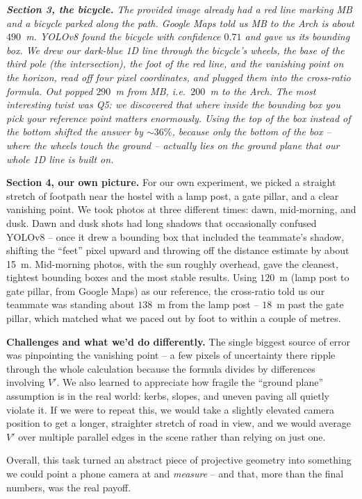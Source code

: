 \documentclass[11pt]{article}
\newenvironment{studentSpace}{\itshape}{}
\begin{document}
\begin{studentSpace}
\textbf{Section 3, the bicycle.} The provided image already had a red
line marking MB and a bicycle parked along the path. Google Maps told
us MB to the Arch is about $490$~m. YOLOv8 found the bicycle with
confidence $0.71$ and gave us its bounding box. We drew our dark-blue
1D line through the bicycle's wheels, the base of the third pole
(the intersection), the foot of the red line, and the vanishing point
on the horizon, read off four pixel coordinates, and plugged them into
the cross-ratio formula. Out popped $290$~m from MB, i.e.\ $200$~m to
the Arch. The most interesting twist was Q5: we discovered that
\emph{where} inside the bounding box you pick your reference point
matters enormously. Using the top of the box instead of the bottom
shifted the answer by $\sim 36\%$, because only the bottom of the box
-- where the wheels touch the ground -- actually lies on the ground
plane that our whole 1D line is built on.

\textbf{Section 4, our own picture.} For our own experiment, we picked
a straight stretch of footpath near the hostel with a lamp post,
a gate pillar, and a clear vanishing point. We took photos at three
different times: dawn, mid-morning, and dusk. Dawn and dusk shots had
long shadows that occasionally confused YOLOv8 -- once it drew a
bounding box that included the teammate's shadow, shifting the
``feet'' pixel upward and throwing off the distance estimate by about
15~m. Mid-morning photos, with the sun roughly overhead, gave the
cleanest, tightest bounding boxes and the most stable results. Using
$120$~m (lamp post to gate pillar, from Google Maps) as our reference,
the cross-ratio told us our teammate was standing about $138$~m from
the lamp post -- $18$~m past the gate pillar, which matched what we
paced out by foot to within a couple of metres.

\textbf{Challenges and what we'd do differently.} The single biggest
source of error was pinpointing the vanishing point -- a few pixels of
uncertainty there ripple through the whole calculation because the
formula divides by differences involving $V'$. We also learned to
appreciate how fragile the ``ground plane'' assumption is in the real
world: kerbs, slopes, and uneven paving all quietly violate it. If we
were to repeat this, we would take a slightly elevated camera position
to get a longer, straighter stretch of road in view, and we would
average $V'$ over multiple parallel edges in the scene rather than
relying on just one.

Overall, this task turned an abstract piece of projective geometry into
something we could point a phone camera at and \emph{measure} --
and that, more than the final numbers, was the real payoff.

\end{studentSpace}
\end{document}
